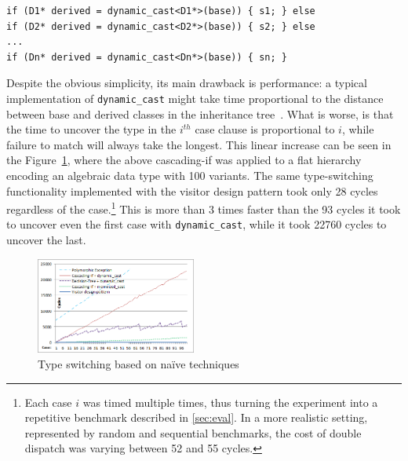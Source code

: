 \documentclass[preprint]{sigplanconf}
\makeatletter
\DeclareRobustCommand{\code}[1]{{\lstinline[breaklines=false,escapechar=@]{#1}}}
\makeatother
\begin{document}
\begin{lstlisting}
if (D1* derived = dynamic_cast<D1*>(base)) { s1; } else
if (D2* derived = dynamic_cast<D2*>(base)) { s2; } else
...
if (Dn* derived = dynamic_cast<Dn*>(base)) { sn; }
\end{lstlisting}

\noindent
Despite the obvious simplicity, its main drawback is performance: a typical 
implementation of \code{dynamic_cast} might take time proportional to the 
distance between base and derived classes in the inheritance tree~\cite{XXXXX}.
What is worse, is that the time to uncover the type in the $i^{th}$ case clause 
is proportional to $i$, while failure to match will always take the longest. 
This linear increase can be seen in the Figure~\ref{fig:DCastVis1}, where 
the above cascading-if was applied to a flat hierarchy encoding an algebraic 
data type with 100 variants. The same type-switching functionality implemented 
with the visitor design pattern took only 28 cycles regardless of the 
case.\footnote{Each case $i$ was timed multiple times, thus turning the experiment 
into a repetitive benchmark described in \textsection\ref{sec:eval}. In a more
realistic setting, represented by random and sequential benchmarks, the cost of 
double dispatch was varying between 52 and 55 cycles.}
This is more than 3 times faster than the 93 cycles it took to uncover even the 
first case with \code{dynamic_cast}, while it took 22760 cycles to uncover the 
last.

\begin{figure}[htbp]
  \centering
    \includegraphics[width=0.47\textwidth]{DCast-vs-Visitors1.png}
  \caption{Type switching based on na\"ive techniques}
  \label{fig:DCastVis1}
\end{figure}
\end{document}
